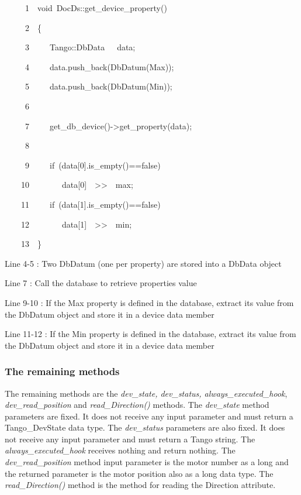 
\begin{lyxcode}
~~~~~1~~void~DocDs::get\_device\_property()

~~~~~2~~\{

~~~~~3~~~~~Tango::DbData~~~data;

~~~~~4~~~~~data.push\_back(DbDatum(\textquotedbl{}Max\textquotedbl{}));

~~~~~5~~~~~data.push\_back(DbDatum(\textquotedbl{}Min\textquotedbl{}));

~~~~~6~~

~~~~~7~~~~~get\_db\_device()->get\_property(data);

~~~~~8~~

~~~~~9~~~~~if~(data{[}0{]}.is\_empty()==false)

~~~~10~~~~~~~~data{[}0{]}~~>\textcompwordmark{}>~~max;

~~~~11~~~~~if~(data{[}1{]}.is\_empty()==false)

~~~~12~~~~~~~~data{[}1{]}~~>\textcompwordmark{}>~~min;

~~~~13~~\}
\end{lyxcode}


Line 4-5 : Two DbDatum (one per property) are stored into a DbData
object

Line 7 : Call the database to retrieve properties value

Line 9-10 : If the Max property is defined in the database, extract
its value from the DbDatum object and store it in a device data member

Line 11-12 : If the Min property is defined in the database, extract
its value from the DbDatum object and store it in a device data member


\subsubsection{The remaining methods}

The remaining methods are the \emph{dev\_state, dev\_status, always\_executed\_hook},
\emph{dev\_read\_position} and \emph{read\_Direction()} methods. The
\emph{dev\_state} method parameters are fixed. It
does not receive any input parameter and must return a Tango\_DevState
data type. The \emph{dev\_status} parameters are
also fixed. It does not receive any input parameter and must return
a Tango string. The \emph{always\_executed\_hook}
receives nothing and return nothing. The \emph{dev\_read\_position}
method input parameter is the motor number as a long and the returned
parameter is the motor position also as a long data type. The \emph{read\_Direction()}
method is the method for reading the Direction attribute.

